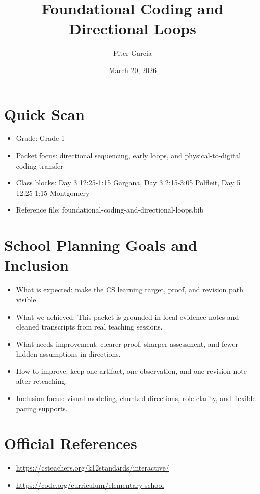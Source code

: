 \documentclass[11pt]{article}
\title{Foundational Coding and Directional Loops}
\author{Piter Garcia}
\date{March 20, 2026}
\begin{document}
\maketitle
\section*{Quick Scan}
\begin{itemize}[leftmargin=*]
\item Grade: Grade 1
\item Packet focus: directional sequencing, early loops, and physical-to-digital coding transfer
\item Class blocks: Day 3 12:25-1:15 Gargana, Day 3 2:15-3:05 Polfleit, Day 5 12:25-1:15 Montgomery
\item Reference file: foundational-coding-and-directional-loops.bib
\end{itemize}
\section*{School Planning Goals and Inclusion}
\begin{itemize}[leftmargin=*]
\item What is expected: make the CS learning target, proof, and revision path visible.
\item What we achieved: This packet is grounded in local evidence notes and cleaned transcripts from real teaching sessions.
\item What needs improvement: clearer proof, sharper assessment, and fewer hidden assumptions in directions.
\item How to improve: keep one artifact, one observation, and one revision note after reteaching.
\item Inclusion focus: visual modeling, chunked directions, role clarity, and flexible pacing supports.
\end{itemize}
\section*{Official References}
\begin{itemize}[leftmargin=*]
\item \url{https://csteachers.org/k12standards/interactive/}
\item \url{https://code.org/curriculum/elementary-school}
\end{itemize}
\end{document}
